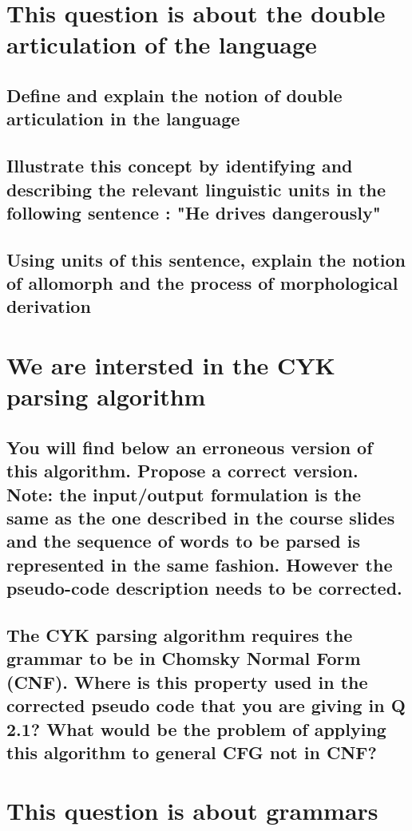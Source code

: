 \documentclass{eplDoc}
\begin{document}
\maketitle
\newpage

\section{This question is about the double articulation of the language}

\subsection{Define and explain the notion of double articulation in the language} 
\subsection{Illustrate this concept by identifying and describing the relevant linguistic units in the following sentence : "He drives dangerously"} 
\subsection{Using units of this sentence, explain the notion of allomorph and the process of morphological derivation} 


\section{We are intersted in the CYK parsing algorithm}
\subsection{You will find below an erroneous version of this algorithm.  Propose a correct version.  Note: the input/output formulation is the same as the one described in the course slides and the sequence of words to be parsed is represented in the same fashion.  However the pseudo-code description needs to be corrected.} 
\subsection{The CYK parsing algorithm requires the grammar to be in Chomsky Normal Form (CNF). Where is this property used in the corrected pseudo code that you are giving in Q 2.1?  What would be the problem of applying this algorithm to general CFG not in CNF?}

\section{This question is about grammars}
\end{document}
